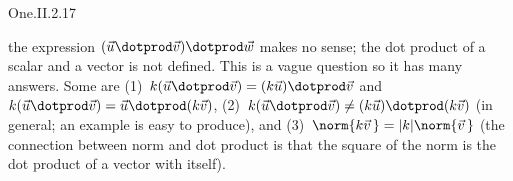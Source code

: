 \begin{ans}{One.II.2.17}
\begin{exparts}
          the expression \( (\vec{u}\dotprod\vec{v})\dotprod\vec{w} \) makes no
          sense; the dot product of a scalar and a vector is not defined.
        \partsitem This is a vague question so it has many answers.
          Some are
          (1)~\( k(\vec{u}\dotprod\vec{v})=(k\vec{u})\dotprod\vec{v} \)
          and \( k(\vec{u}\dotprod\vec{v})=\vec{u}\dotprod(k\vec{v}) \),
          (2)~\( k(\vec{u}\dotprod\vec{v})\neq (k\vec{u})\dotprod(k\vec{v}) \)
          (in general; an example is easy to produce), and
          (3)~\( \norm{k\vec{v}\,}=\lvert k\rvert\norm{\vec{v}\,} \)
          (the connection between
          norm and dot product is that the square of the norm is the
          dot product of a vector with itself).
      \end{exparts}
    
\end{ans}
